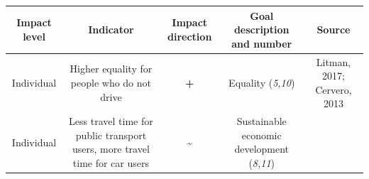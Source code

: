 \documentclass[
]{book}
\begin{document}
\begin{longtable}[]{@{}ccccc@{}}
\toprule
\begin{minipage}[b]{0.17\columnwidth}\centering
Impact level\strut
\end{minipage} & \begin{minipage}[b]{0.16\columnwidth}\centering
Indicator\strut
\end{minipage} & \begin{minipage}[b]{0.17\columnwidth}\centering
Impact direction\strut
\end{minipage} & \begin{minipage}[b]{0.17\columnwidth}\centering
Goal description and number\strut
\end{minipage} & \begin{minipage}[b]{0.17\columnwidth}\centering
Source\strut
\end{minipage}\tabularnewline
\midrule
\endhead
\begin{minipage}[t]{0.17\columnwidth}\centering
Individual\strut
\end{minipage} & \begin{minipage}[t]{0.16\columnwidth}\centering
Higher equality for people who do not drive\strut
\end{minipage} & \begin{minipage}[t]{0.17\columnwidth}\centering
\textbf{+}\strut
\end{minipage} & \begin{minipage}[t]{0.17\columnwidth}\centering
Equality (\emph{5,10})\strut
\end{minipage} & \begin{minipage}[t]{0.17\columnwidth}\centering
Litman, 2017; Cervero, 2013\strut
\end{minipage}\tabularnewline
\begin{minipage}[t]{0.17\columnwidth}\centering
Individual\strut
\end{minipage} & \begin{minipage}[t]{0.16\columnwidth}\centering
Less travel time for public transport users, more travel time for car users\strut
\end{minipage} & \begin{minipage}[t]{0.17\columnwidth}\centering
\textbf{\textasciitilde{}}\strut
\end{minipage} & \begin{minipage}[t]{0.17\columnwidth}\centering
Sustainable economic development (\emph{8,11})\strut
\end{minipage} & \begin{minipage}[t]{0.17\columnwidth}\centering

\end{minipage}
\end{longtable}
\end{document}
